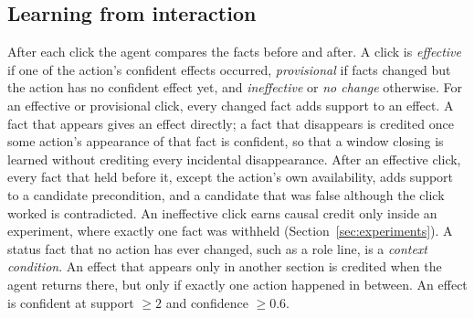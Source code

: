 \documentclass[conference]{IEEEtran}
\begin{document}
\subsection{Learning from interaction}
After each click the agent compares the facts before and after. A click is \emph{effective} if one of the action's confident effects occurred, \emph{provisional} if facts changed but the action has no confident effect yet, and \emph{ineffective} or \emph{no change} otherwise. For an effective or provisional click, every changed fact adds support to an effect. A fact that appears gives an effect directly; a fact that disappears is credited once some action's appearance of that fact is confident, so that a window closing is learned without crediting every incidental disappearance. After an effective click, every fact that held before it, except the action's own availability, adds support to a candidate precondition, and a candidate that was false although the click worked is contradicted. An ineffective click earns causal credit only inside an experiment, where exactly one fact was withheld (Section~\ref{sec:experiments}). A status fact that no action has ever changed, such as a role line, is a \emph{context condition}. An effect that appears only in another section is credited when the agent returns there, but only if exactly one action happened in between. An effect is confident at support $\ge 2$ and confidence $\ge 0.6$.
\end{document}
